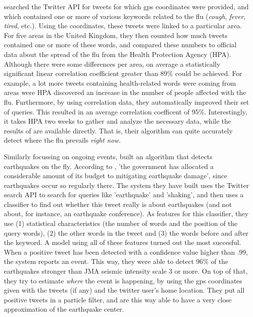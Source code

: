 \documentclass[12pt]{article}
\begin{document}
 searched the Twitter API for tweets for which gps coordinates were provided, and which contained one or more of various keywords related to the flu (\emph{cough}, \emph{fever}, \emph{tired}, etc.). Using the coordinates, these tweets were linked to a particular area. For five areas in the United Kingdom, they then counted how much tweets contained one or more of these words, and compared these numbers to official data about the spread of the flu from the Health Protection Agency (HPA). Although there were some differences per area, on average a statistically significant linear correlation coefficient greater than 89\% could be achieved. For example, a lot more tweets containing health-related words were coming from areas were HPA discovered an increase in the number of people affected with the flu. Furthermore, by using correlation data, they automatically improved their set of queries. This resulted in an average correlation coefficent of 95\%.  Interestingly, it takes HPA two weeks to gather and analyze the necessary data, while the results of  are available directly. That is, their algorithm can quite accurately detect where the flu prevails \emph{right now}.

Similarly focussing on ongoing events,  built an algorithm that detects earthquakes on the fly. According to , 'the government has allocated a considerable amount of its budget to mitigating earthquake damage', since earthquakes occur so regularly there. The system they have built uses the Twitter search API to search for queries like 'earthquake' and 'shaking', and then uses a classifier to find out whether this tweet really is about earthquakes (and not about, for instance, an earthquake conference). As features for this classifier, they use (1) statistical characteristics (the number of words and the position of the query words), (2) the other words in the tweet and (3) the words before and after the keyword. A model using all of these features turned out the most succesful. When a positive tweet has been detected with a confidence value higher than .99, the system reports an event. This way, they were able to detect 96\% of the earthquakes stronger than JMA seismic intensity scale 3 or more. On top of that, they try to estimate \emph{where} the event is happening, by using the gps coordinates given with the tweets (if any) and the twitter user's home location. They put all positive tweets in a particle filter, and are this way able to have a very close approximation of the earthquake center.
\end{document}
